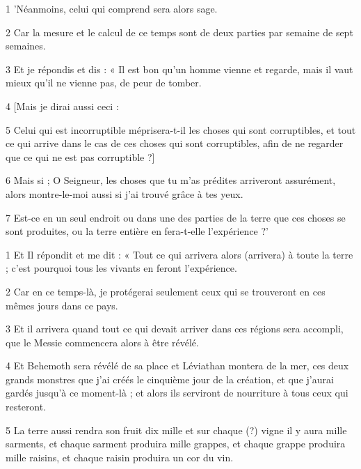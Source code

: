 \par 1 'Néanmoins, celui qui comprend sera alors sage.

\par 2 Car la mesure et le calcul de ce temps sont de deux parties par semaine de sept semaines.

\par 3 Et je répondis et dis : « Il est bon qu'un homme vienne et regarde, mais il vaut mieux qu'il ne vienne pas, de peur de tomber.

\par 4 [Mais je dirai aussi ceci :

\par 5 Celui qui est incorruptible méprisera-t-il les choses qui sont corruptibles, et tout ce qui arrive dans le cas de ces choses qui sont corruptibles, afin de ne regarder que ce qui ne est pas corruptible ?]

\par 6 Mais si ; O Seigneur, les choses que tu m'as prédites arriveront assurément, alors montre-le-moi aussi si j'ai trouvé grâce à tes yeux.

\par 7 Est-ce en un seul endroit ou dans une des parties de la terre que ces choses se sont produites, ou la terre entière en fera-t-elle l'expérience ?'


\par 1 Et Il répondit et me dit : « Tout ce qui arrivera alors (arrivera) à toute la terre ; c'est pourquoi tous les vivants en feront l'expérience.

\par 2 Car en ce temps-là, je protégerai seulement ceux qui se trouveront en ces mêmes jours dans ce pays.

\par 3 Et il arrivera quand tout ce qui devait arriver dans ces régions sera accompli, que le Messie commencera alors à être révélé.

\par 4 Et Behemoth sera révélé de sa place et Léviathan montera de la mer, ces deux grands monstres que j'ai créés le cinquième jour de la création, et que j'aurai gardés jusqu'à ce moment-là ; et alors ils serviront de nourriture à tous ceux qui resteront.

\par 5 La terre aussi rendra son fruit dix mille et sur chaque (?) vigne il y aura mille sarments, et chaque sarment produira mille grappes, et chaque grappe produira mille raisins, et chaque raisin produira un cor du vin.


